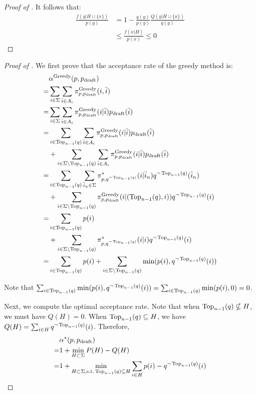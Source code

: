 \documentclass{article}
\begin{document}
\begin{proof}[Proof of ]
It follows that:
\begin{align}
\frac{f(y|H\cup\{x\})}{p(y)}&=1-\frac{q(y)}{p(y)}\frac{Q(y|H\cup\{x\})}{q(y)}\\
&\leq\frac{f(x|H)}{p(x)}\leq0
\end{align}
\end{proof} \begin{proof}[Proof of ]
We first prove that the acceptance rate of the greedy method is:
\begin{align}
&\alpha^{\operatorname{Greedy}}(p,p_{\operatorname{draft}})
\\=&
\sum_{i\in\Sigma} \sum_{\bar{i}\in A_i}\pi^{\operatorname{Greedy}}_{p,p_{\operatorname{draft}}}(i,\bar{i})
\\=&
\sum_{i\in\Sigma} \sum_{\bar{i}\in A_i}\pi^{\operatorname{Greedy}}_{p,p_{\operatorname{draft}}}(i|\bar{i}) p_{\operatorname{draft}}(\bar{i})
\\=&
\sum_{i\in\operatorname{Top}_{n-1}(q)} \sum_{\bar{i}\in A_i}\pi^{\operatorname{Greedy}}_{p,p_{\operatorname{draft}}}(i|\bar{i}) p_{\operatorname{draft}}(\bar{i})
\\&+
\sum_{i\in\Sigma\setminus\operatorname{Top}_{n-1}(q)} \sum_{\bar{i}\in A_i}\pi^{\operatorname{Greedy}}_{p,p_{\operatorname{draft}}}(i|\bar{i}) p_{\operatorname{draft}}(\bar{i})
\\=&
\sum_{i\in\operatorname{Top}_{n-1}(q)} \sum_{\bar{i}_n\in \Sigma}\pi^\ast_{p,q^{\neg \operatorname{Top}_{n-1}(q)}}(i|\bar{i}_n) q^{\neg \operatorname{Top}_{n-1}(q)}(\bar{i}_n)
\\&+
\sum_{i\in\Sigma\setminus\operatorname{Top}_{n-1}(q)} \pi^{\operatorname{Greedy}}_{p,p_{\operatorname{draft}}}(i|(\operatorname{Top}_{n-1}(q),i)) q^{\neg \operatorname{Top}_{n-1}(q)}(i)
\\=&
\sum_{i\in\operatorname{Top}_{n-1}(q)} p(i)
\\&+
\sum_{i\in\Sigma\setminus\operatorname{Top}_{n-1}(q)} \pi^\ast_{p,q^{\neg \operatorname{Top}_{n-1}(q)}}(i|i) q^{\neg \operatorname{Top}_{n-1}(q)}(i)
\\=&
\sum_{i\in\operatorname{Top}_{n-1}(q)} p(i)
+
\sum_{i\in\Sigma\setminus\operatorname{Top}_{n-1}(q)} \min(p(i),q^{\neg \operatorname{Top}_{n-1}(q)}(i))
\end{align}

Note that $\sum_{i\in\operatorname{Top}_{n-1}(q)} \min(p(i),q^{\neg \operatorname{Top}_{n-1}(q)}(i))=\sum_{i\in\operatorname{Top}_{n-1}(q)} \min(p(i),0)=0$.

Next, we compute the optimal acceptance rate. Note that when $\operatorname{Top}_{n-1}(q)\nsubseteq H$, we must have $Q(H)=0$. When $\operatorname{Top}_{n-1}(q)\subseteq H$, we have $Q(H)=\sum_{i\in H} q^{\neg \operatorname{Top}_{n-1}(q)}(i)$. Therefore,
\begin{align}
&\alpha^\ast(p,p_{\operatorname{draft}})
\\=&
1+\min_{H\subset\Sigma} P(H)-Q(H)
\\=&
1+\min_{H\subset\Sigma,\text{s.t.}\operatorname{Top}_{n-1}(q)\subseteq H} \sum_{i\in H} p(i)-q^{\neg \operatorname{Top}_{n-1}(q)}(i)
\end{align}


\end{proof}
\end{document}
